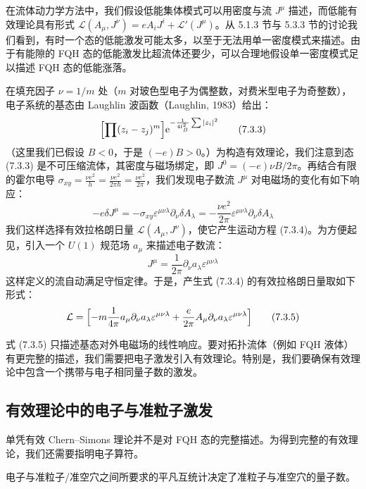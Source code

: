 在流体动力学方法中，我们假设低能集体模式可以用密度与流 $J^\mu$ 描述，而低能有效理论具有形式 $\mathcal{L}(A_\mu,J^\nu)=eA_iJ^i+\mathcal{L}'(J^\mu)$。从 5.1.3 节与 5.3.3 节的讨论我们看到，有时一个态的低能激发可能太多，以至于无法用单一密度模式来描述。由于有能隙的 FQH 态的低能激发比超流体还要少，可以合理地假设单一密度模式足以描述 FQH 态的低能涨落。

在填充因子 $\nu=1/m$ 处（$m$ 对玻色型电子为偶整数，对费米型电子为奇整数），电子系统的基态由 Laughlin 波函数（Laughlin, 1983）给出：
\begin{equation*}
\Bigl[\prod(z_i-z_j)^m\Bigr]\mathrm{e}^{-\frac{1}{4l_B^2}\sum|z_i|^2}
\tag{7.3.3}
\end{equation*}
（这里我们已假设 $B<0$，于是 $(-e)B>0$。）为构造有效理论，我们注意到态 (7.3.3) 是不可压缩流体，其密度与磁场绑定，即 $J^0=(-e)\nu B/2\pi$。再结合有限的霍尔电导 $\sigma_{xy}=\frac{\nu e^2}{h}=\frac{\nu e^2}{2\pi\hbar}=\frac{\nu e^2}{2\pi}$，我们发现电子数流 $J^\mu$ 对电磁场的变化有如下响应：
\begin{equation*}
-e\delta J^\mu=-\sigma_{xy}\varepsilon^{\mu\nu\lambda}\partial_\nu\delta A_\lambda=-\frac{\nu e^2}{2\pi}\varepsilon^{\mu\nu\lambda}\partial_\nu\delta A_\lambda
\tag{7.3.4}
\end{equation*}
我们这样选择有效拉格朗日量 $\mathcal{L}(A_\mu,J^\nu)$，使它产生运动方程 (7.3.4)。为方便起见，引入一个 $U(1)$ 规范场 $a_\mu$ 来描述电子数流：
\begin{equation*}
J^\mu=\frac{1}{2\pi}\partial_\nu a_\lambda\varepsilon^{\mu\nu\lambda}
\end{equation*}
这样定义的流自动满足守恒定律。于是，产生式 (7.3.4) 的有效拉格朗日量取如下形式：
\begin{equation*}
\mathcal{L}=\Bigl[-m\frac{1}{4\pi}a_\mu\partial_\nu a_\lambda\varepsilon^{\mu\nu\lambda}+\frac{e}{2\pi}A_\mu\partial_\nu a_\lambda\varepsilon^{\mu\nu\lambda}\Bigr]
\tag{7.3.5}
\end{equation*}

式 (7.3.5) 只描述基态对外电磁场的线性响应。要对拓扑流体（例如 FQH 液体）有更完整的描述，我们需要把电子激发引入有效理论。特别是，我们要确保有效理论中包含一个携带与电子相同量子数的激发。

\subsection{有效理论中的电子与准粒子激发}

\begin{keypoints}
\item 单凭有效 Chern--Simons 理论并不是对 FQH 态的完整描述。为得到完整的有效理论，我们还需要指明电子算符。
\item 电子与准粒子/准空穴之间所要求的平凡互统计决定了准粒子与准空穴的量子数。
\end{keypoints}

